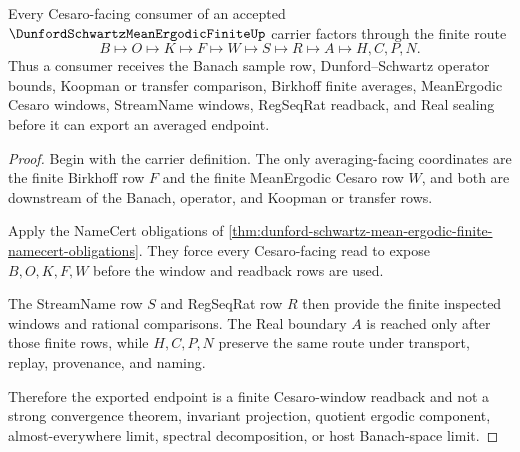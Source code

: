 \begin{theorem}
\label{thm:dunford-schwartz-mean-ergodic-finite-cesaro-route}
Every Cesaro-facing consumer of an accepted $\DunfordSchwartzMeanErgodicFiniteUp$ carrier factors through the finite route
$$
B \longmapsto O \longmapsto K \longmapsto F \longmapsto W \longmapsto S \longmapsto R \longmapsto A \longmapsto H,C,P,N .
$$
Thus a consumer receives the Banach sample row, Dunford--Schwartz operator bounds, Koopman or transfer comparison, Birkhoff finite averages, MeanErgodic Cesaro windows, StreamName windows, RegSeqRat readback, and Real sealing before it can export an averaged endpoint.
\end{theorem}
\begin{proof}
Begin with the carrier definition. The only averaging-facing coordinates are the finite Birkhoff row $F$ and the finite MeanErgodic Cesaro row $W$, and both are downstream of the Banach, operator, and Koopman or transfer rows.

Apply the NameCert obligations of \autoref{thm:dunford-schwartz-mean-ergodic-finite-namecert-obligations}. They force every Cesaro-facing read to expose $B,O,K,F,W$ before the window and readback rows are used.

The StreamName row $S$ and RegSeqRat row $R$ then provide the finite inspected windows and rational comparisons. The Real boundary $A$ is reached only after those finite rows, while $H,C,P,N$ preserve the same route under transport, replay, provenance, and naming.

Therefore the exported endpoint is a finite Cesaro-window readback and not a strong convergence theorem, invariant projection, quotient ergodic component, almost-everywhere limit, spectral decomposition, or host Banach-space limit.
\end{proof}


